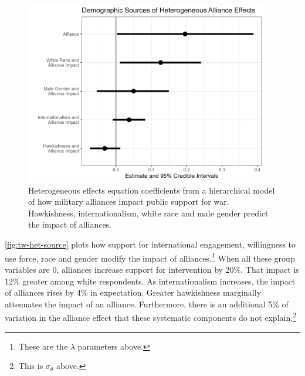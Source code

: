\documentclass[12pt]{article}
\begin{document}
\begin{figure}[htpb]
	\centering
		\includegraphics[width=0.95\textwidth]{../figures/tw-het-source.png}
	\caption{Heterogeneous effects equation coefficients from a hierarchical model of how military alliances impact public support for war. Hawkishness, internationalism, white race and male gender predict the impact of alliances.}
	\label{fig:tw-het-source}
\end{figure}


\autoref{fig:tw-het-source} plots how support for international engagement, willingness to use force, race and gender modify the impact of alliances.\footnote{These are the $\lambda$ parameters above.}
When all these group variables are 0, alliances increase support for intervention by 20\%. 
That impact is 12\% greater among white respondents. 
As internationalism increases, the impact of alliances rises by 4\% in expectation.
Greater hawkishness marginally attenuates the impact of an alliance. 
Furthermore, there is an additional 5\% of variation in the alliance effect that these systematic components do not explain.\footnote{This is $\sigma_\theta$ above.}
\end{document}
